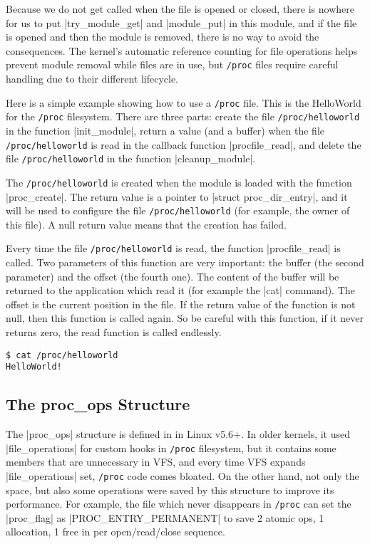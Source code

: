 \documentclass[10pt, oneside]{book}
\begin{document}
Because we do not get called when the file is opened or closed, there is nowhere for us to put \cpp|try_module_get| and \cpp|module_put| in this module, and if the file is opened and then the module is removed, there is no way to avoid the consequences.
The kernel's automatic reference counting for file operations helps prevent module removal while files are in use,
but \verb|/proc| files require careful handling due to their different lifecycle.

Here is a simple example showing how to use a \verb|/proc| file.
This is the HelloWorld for the \verb|/proc| filesystem.
There are three parts: create the file \verb|/proc/helloworld| in the function \cpp|init_module|, return a value (and a buffer) when the file \verb|/proc/helloworld| is read in the callback function \cpp|procfile_read|, and delete the file \verb|/proc/helloworld| in the function \cpp|cleanup_module|.

The \verb|/proc/helloworld| is created when the module is loaded with the function \cpp|proc_create|.
The return value is a pointer to \cpp|struct proc_dir_entry|, and it will be used to configure the file \verb|/proc/helloworld| (for example, the owner of this file).
A null return value means that the creation has failed.

Every time the file \verb|/proc/helloworld| is read, the function \cpp|procfile_read| is called.
Two parameters of this function are very important: the buffer (the second parameter) and the offset (the fourth one).
The content of the buffer will be returned to the application which read it (for example the \sh|cat| command).
The offset is the current position in the file.
If the return value of the function is not null, then this function is called again.
So be careful with this function, if it never returns zero, the read function is called endlessly.

\begin{verbatim}
$ cat /proc/helloworld
HelloWorld!
\end{verbatim}


\subsection{The proc\_ops Structure}
\label{sec:proc_ops}
The \cpp|proc_ops| structure is defined in  in Linux v5.6+.
In older kernels, it used \cpp|file_operations| for custom hooks in \verb|/proc| filesystem, but it contains some members that are unnecessary in VFS, and every time VFS expands \cpp|file_operations| set, \verb|/proc| code comes bloated.
On the other hand, not only the space, but also some operations were saved by this structure to improve its performance.
For example, the file which never disappears in \verb|/proc| can set the \cpp|proc_flag| as \cpp|PROC_ENTRY_PERMANENT| to save 2 atomic ops, 1 allocation, 1 free in per open/read/close sequence.
\end{document}
